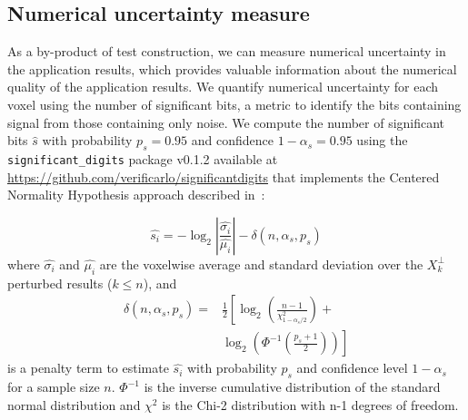 \documentclass[lettersize,journal]{IEEEtran}
\begin{document}


\subsection{Numerical uncertainty measure}

As a by-product of test construction, we can measure numerical uncertainty in the application results, which provides valuable information about the numerical quality of the application results.
We quantify numerical uncertainty for each voxel using the number of significant bits, a metric to identify the bits containing signal from those containing only noise. We compute the number of significant bits $\hat{s}$ with probability $p_s=0.95$ and confidence $1-\alpha_s=0.95$ using the \texttt{significant\_digits} package v0.1.2 available at \url{https://github.com/verificarlo/significantdigits} that implements the Centered Normality Hypothesis approach described in~\cite{sohier2021confidence}:

\[
    \hat{s_i} = -\log_2 \left| \frac{\hat{\sigma_i}}{\hat{\mu_i}} \right| - \delta(n, \alpha_s, p_s)
\]
where $\hat{\sigma_i}$ and $\hat{\mu_i}$ are the voxelwise average and standard deviation over the $X_k^\perp$ perturbed results ($k \leq n$), and
\begin{equation}
    \begin{split}
    \delta(n, \alpha_s, p_s) =& \frac{1}{2} \left[ \log_2 \left( \frac{n-1}{\chi^2_{1-\alpha_s/2}} \right) + \right. \\
                              &  \left. \log_2 \left( \Phi^{-1} \left( \frac{p_s+1}{2} \right) \right) \right] 
    \end{split}
\end{equation}
is a penalty term to estimate $\hat{s_i}$ with probability $p_s$ and confidence level $1-\alpha_s$ for a sample size $n$. $\Phi^{-1}$ is the inverse cumulative distribution of the standard normal distribution and $\chi^2$ is the Chi-2 distribution with n-1 degrees of freedom.
\end{document}
